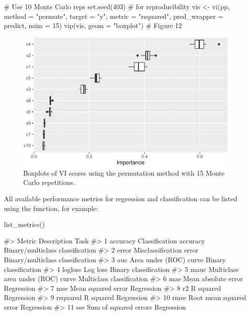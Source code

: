 \begin{Schunk}
\begin{Sinput}
# Use 10 Monte Carlo reps
set.seed(403)  # for reproducibility
vis <- vi(pp, method = "permute", target = "y", metric = "rsquared",
          pred_wrapper = predict, nsim = 15)
vip(vis, geom = "boxplot")  # Figure 12
\end{Sinput}
\begin{figure}[!htb]

{\centering \includegraphics[width=0.7\linewidth]{greenwell-boehmke_files/figure-latex/vip-boxplots-1} 

}

\caption[Boxplots of VI scores using the permutation method with 15 Monte Carlo repetitions]{Boxplots of VI scores using the permutation method with 15 Monte Carlo repetitions.}\label{fig:vip-boxplots}
\end{figure}
\end{Schunk}

All available performance metrics for regression and classification can
be listed using the  function, for example:

\begin{Schunk}
\begin{Sinput}
list_metrics()
\end{Sinput}
\begin{Soutput}
#>      Metric                       Description                             Task
#> 1  accuracy           Classification accuracy Binary/multiclass classification
#> 2     error           Misclassification error Binary/multiclass classification
#> 3       auc            Area under (ROC) curve            Binary classification
#> 4   logloss                          Log loss            Binary classification
#> 5      mauc Multiclass area under (ROC) curve        Multiclass classification
#> 6       mae               Mean absolute error                       Regression
#> 7       mse                Mean squared error                       Regression
#> 8        r2                         R squared                       Regression
#> 9  rsquared                         R squared                       Regression
#> 10     rmse           Root mean squared error                       Regression
#> 11      sse             Sum of squared errors                       Regression
\end{Soutput}
\end{Schunk}

